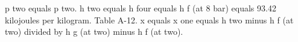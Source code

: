 p two equals p two.  
h two equals h four equals h f (at 8 bar) equals 93.42 kilojoules per kilogram. Table A-12.  
x equals x one equals h two minus h f (at two) divided by h g (at two) minus h f (at two).